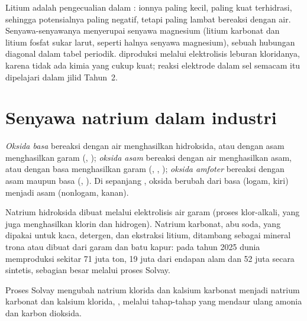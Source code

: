Litium adalah pengecualian dalam : ionnya paling kecil, paling
kuat terhidrasi, sehingga potensialnya paling negatif, tetapi paling
lambat bereaksi dengan air. Senyawa-senyawanya menyerupai senyawa
magnesium (litium karbonat dan litium fosfat sukar larut, seperti halnya
senyawa magnesium), sebuah hubungan diagonal dalam tabel periodik.  diproduksi melalui elektrolisis leburan kloridanya, karena tidak
ada  kimia yang cukup kuat; reaksi elektrode dalam sel semacam
itu dipelajari dalam jilid Tahun~2.

\section{Senyawa natrium dalam industri}

\begin{definition}\label{def:b1:s-block:oxide-character}
\emph{Oksida basa} bereaksi dengan air menghasilkan
hidroksida, atau dengan asam menghasilkan garam (, );
\emph{oksida asam} bereaksi dengan air menghasilkan
asam, atau dengan basa menghasilkan garam (, ,
); \emph{oksida amfoter} bereaksi dengan
asam maupun basa (, ). Di sepanjang , oksida
berubah dari basa (logam, kiri) menjadi asam (nonlogam, kanan).
\end{definition}

Natrium hidroksida dibuat melalui elektrolisis air garam (proses
klor-alkali, yang juga menghasilkan klorin dan hidrogen). Natrium
karbonat, abu soda, yang dipakai untuk kaca, detergen, dan ekstraksi
litium, ditambang sebagai mineral trona atau dibuat dari garam dan batu
kapur: pada tahun 2025 dunia memproduksi sekitar 71 juta ton, 19 juta dari
endapan alam dan 52 juta secara sintetis, sebagian besar melalui proses
Solvay.

\begin{proposition}\label{prop:b1:s-block:solvay}
Proses Solvay mengubah natrium klorida dan kalsium karbonat menjadi
natrium karbonat dan kalsium klorida, , melalui tahap-tahap yang mendaur ulang amonia dan karbon
dioksida.
\end{proposition}


